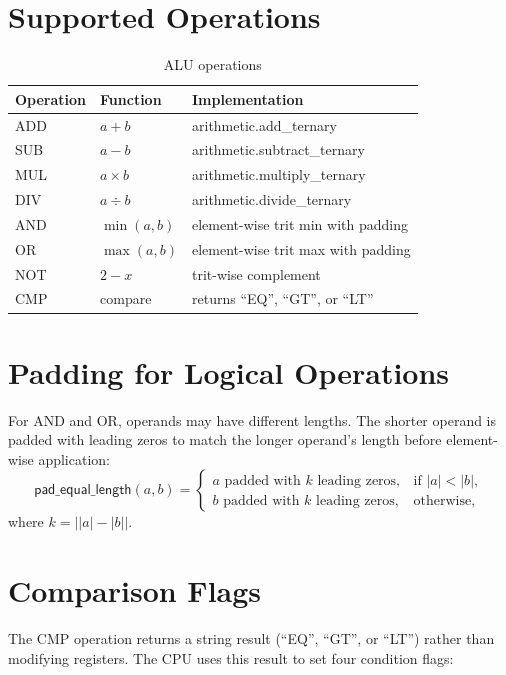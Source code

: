\documentclass[12pt,a4paper,twoside]{book}
\theoremstyle{trinarytheorem}
\theoremstyle{trinarydefinition}
\newcommand{\code}[1]{\textsf{#1}}
\begin{document}
\section{Supported Operations}

\begin{table}[H]
\centering
\caption{ALU operations}
\label{tab:aluops}
\begin{tabular}{lll}
\toprule
Operation & Function & Implementation \\
\midrule
ADD & $a + b$ & \code{arithmetic.add\_ternary} \\
SUB & $a - b$ & \code{arithmetic.subtract\_ternary} \\
MUL & $a \times b$ & \code{arithmetic.multiply\_ternary} \\
DIV & $a \div b$ & \code{arithmetic.divide\_ternary} \\
AND & $\min(a,b)$ & element-wise trit min with padding \\
OR  & $\max(a,b)$ & element-wise trit max with padding \\
NOT & $2 - x$ & trit-wise complement \\
CMP & compare & returns ``EQ'', ``GT'', or ``LT'' \\
\bottomrule
\end{tabular}
\end{table}

\section{Padding for Logical Operations}

For AND and OR, operands may have different lengths. The shorter operand is padded
with leading zeros to match the longer operand's length before element-wise application:
\[
\code{pad\_equal\_length}(a,b) =
\begin{cases}
a\text{ padded with }k\text{ leading zeros}, & \text{if } |a| < |b|, \\
b\text{ padded with }k\text{ leading zeros}, & \text{otherwise},
\end{cases}
\]
where $k = \bigl||a| - |b|\bigr|$.

\section{Comparison Flags}

The CMP operation returns a string result (``EQ'', ``GT'', or ``LT'') rather than
modifying registers. The CPU uses this result to set four condition flags:
\end{document}
